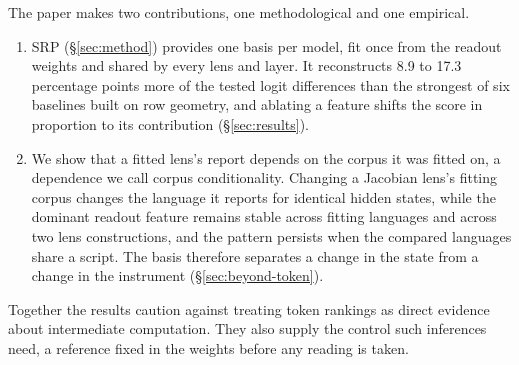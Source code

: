 The paper makes two contributions, one methodological and one
empirical.
\begin{enumerate}[leftmargin=*, itemsep=2pt, topsep=3pt]
\item SRP (\S\ref{sec:method}) provides one basis per model, fit once
from the readout weights and shared by every lens and layer. It
reconstructs 8.9 to 17.3 percentage points more of the tested logit
differences than the strongest of six baselines built on row geometry, and ablating a
feature shifts the score in proportion to its contribution
(\S\ref{sec:results}).
\item We show that a fitted lens's report depends on the corpus it
was fitted on, a dependence we call corpus conditionality. Changing a
Jacobian lens's fitting corpus changes the language it reports for
identical hidden states, while the dominant readout feature remains
stable across fitting languages and across two lens constructions, and
the pattern persists when the compared languages share a script. The basis therefore
separates a change in the state from a change in the instrument
(\S\ref{sec:beyond-token}).
\end{enumerate}

Together the results caution against treating token rankings as direct
evidence about intermediate computation. They also supply the control
such inferences need, a reference fixed in the weights before any
reading is taken.
